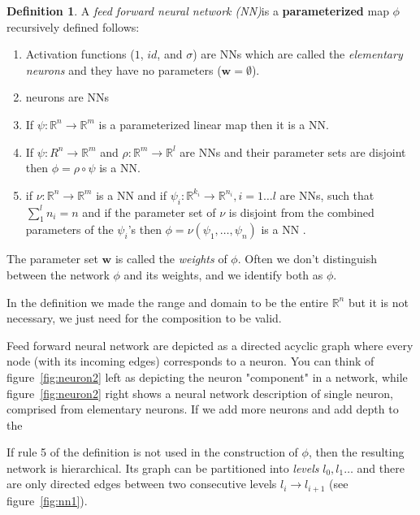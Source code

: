 \documentclass[11pt, a4paper]{report}
\theoremstyle{plain}
\theoremstyle{definition}
\newtheorem{mydef}{Definition}[chapter]
\theoremstyle{remark}
\newcommand{\R}{\mathbb{R}}
\newcommand{\w}{\mathbf{w}}
\begin{document}
\begin{mydef}
\label{def:NN}
A \emph{feed forward neural network (NN)}is a \textbf{parameterized} map $\phi$
recursively defined
follows:
\begin{enumerate}
\item{} 
Activation functions ($1$, $id$, and $\sigma$) are NNs which are called the
\emph{elementary neurons} and they have no parameters ($\w=\emptyset$).
\item{} neurons are NNs
\item{} If $\psi :\R^n \to \R^m$ is a parameterized linear map then it is a NN.
\item{} If $\psi : R^n \to \R^m$
and $\rho: \R^m \to \R^l$ are NNs and their parameter sets are disjoint then $\phi = \rho
\circ \psi$ is a NN.
\item{} if $\nu:\R^n \to \R^m$ is a NN
and if $\psi_i: \R^{k_i} \to \R^{n_i}, i =1 \dots l$ are NNs, such that
$\sum_1^l n_i = n$
and if the parameter set of $\nu$ is disjoint from the combined parameters of
the $\psi_i$'s then
$\phi = \nu(\psi_1, \dots, \psi_n)$ is a NN
.
\end{enumerate}

The parameter set $\w$ is called the \emph{weights} of $\phi$.
Often we don't distinguish between the network $\phi$ and its weights, and
we identify both as $\phi$.

In the definition we made the range and domain to be the entire $\R^n$ but
it is not necessary, we just need for the composition to be valid.
\end{mydef}

Feed forward neural network 
are depicted as a directed acyclic graph where every node (with its incoming
edges) corresponds to a neuron.
You can think of figure~\ref{fig:neuron2} left as depicting the neuron "component" 
in a network, while figure~\ref{fig:neuron2} right shows a neural network
description of single neuron, comprised from elementary neurons.
If we add more neurons and add depth to the

If rule 5 of the definition is not used in the construction of $\phi$, then the
resulting network is hierarchical. Its graph can be partitioned into \emph{levels}
$l_0, l_1\dots$ and there are only directed edges between two consecutive
levels $l_i \to l_{i+1}$ (see figure~\ref{fig:nn1}).
\end{document}
